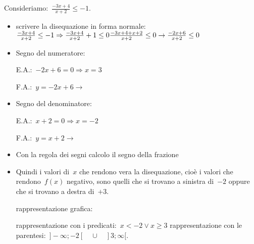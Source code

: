  \begin{esempio}
Consideriamo:~$\frac{-3 x +4}{x+2} \le -1$.
\begin{itemize} [noitemsep]
 \item scrivere la disequazione in forma normale:
 $\frac{-3 x +4}{x+2} \le -1 \Rightarrow \frac{-3 x +4}{x+2} +1 \le 0 \newline
 \frac{-3 x +4 + x +2}{x+2} \le 0 \rightarrow \frac{-2 x +6}{x+2} \le 0$
 \item Segno del numeratore:\\
 \begin{minipage}{.45\textwidth}
  E.A.:~$-2 x +6=0 \Rightarrow x=3$
 \end{minipage}
 \begin{minipage}{.25\textwidth}
  F.A.:~$y=-2 x +6 \rightarrow $
 \end{minipage}
 \begin{minipage}{.3\textwidth}
  
 \end{minipage}
 \item Segno del denominatore:\\
 \begin{minipage}{.45\textwidth}
  E.A.:~$x + 2=0 \Rightarrow x=-2$
 \end{minipage}
 \begin{minipage}{.25\textwidth}
  F.A.:~$y=x +2 \rightarrow $
 \end{minipage}
 \begin{minipage}{.3\textwidth}
  
 \end{minipage}
 \item Con la regola dei segni calcolo il segno della frazione
  
 \item Quindi i valori di~$x$ che rendono vera la disequazione, cioè i valori
  che rendono~$f(x)$ negativo, sono quelli
  che si trovano a sinistra di~$-2$ oppure che si trovano a destra di~$+3$.
 \subitem
  \begin{minipage}{.35\textwidth}
   rappresentazione grafica:
  \end{minipage}
  \begin{minipage}{.30\textwidth}
   
  \end{minipage}
 \subitem rappresentazione con i predicati:~$x < -2 \lor x \ge 3$
 \subitem rappresentazione con le
  parentesi:~$]-\infty; -2[ \quad \cup \quad ]3; \infty[$.
\end{itemize}
 \end{esempio}

